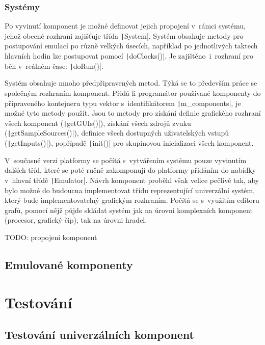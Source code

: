 \subsection{Systémy}
Po vyvinutí komponent je možné definovat jejich propojení v~rámci systému, jehož obecné rozhraní zajišťuje třída \texttt|System|. Systém obsahuje metody pro postupování emulací po různě velkých úsecích, například po jednotlivých taktech hlavních hodin lze postupovat pomocí \texttt|doClocks()|. Je zajištěno~i~rozhraní pro běh v~reálném čase: \texttt|doRun()|.

Systém obsahuje mnoho předpřipravených metod. Týká se to především práce se společným rozhraním komponent. Přidá-li programátor používané komponenty do připraveného kontejneru typu vektor s~identifikátorem \texttt|m_components|, je možné tyto metody použít. Jsou to metody pro získání definic grafického rozhraní všech komponent (\texttt|getGUIs()|), získání všech zdrojů zvuku (\texttt|getSampleSources()|), definice všech dostupných uživatelských vstupů (\texttt|getInputs()|), popřípadě \texttt|init()| pro skupinovou inicializaci všech komponent.

\begin{note}
	V~současné verzi platformy se počítá s~vytvářením systému pouze vyvinutím dalších tříd, které se poté ručně zakomponují do platformy přidáním do nabídky v~hlavní třídě \texttt|Emulator|. Návrh komponent proběhl však velice pečlivě tak, aby bylo možné do budoucna implementovat třídu reprezentující univerzální systém, který bude implementovatelný grafickým rozhraním. Počítá se s~využitím editoru grafů, pomocí nějž půjde skládat systém jak na úrovni komplexních komponent (procesor, grafický čip), tak na úrovni hradel.
\end{note}

TODO: propojeni komponent

\section{Emulované komponenty}

\chapter{Testování}

\section{Testování univerzálních komponent}

